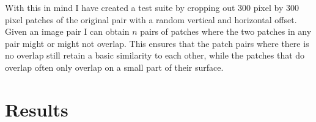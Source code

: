 \documentclass{article}
\begin{document}
With this in mind I have created a test suite by cropping out $300$ 
pixel by $300$ pixel patches of the original pair with a random vertical 
and horizontal offset. Given an image pair I can obtain $n$ pairs of 
patches where the two patches in any pair might or might not overlap.  
This ensures that the patch pairs where there is no overlap still retain 
a basic similarity to each other, while the patches that do overlap 
often only overlap on a small part of their surface.

\section{Results}
\label{results}





\end{document}
